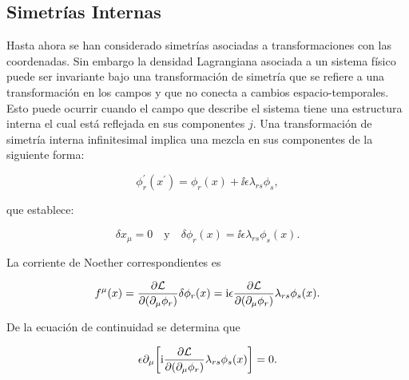 
\subsection{Simetrías Internas} \label{simint}

Hasta ahora se han considerado simetrías asociadas a transformaciones con las coordenadas. Sin embargo la densidad Lagrangiana asociada a un sistema físico puede ser invariante bajo una transformación de simetría que se refiere a una transformación en los campos y que no conecta a cambios espacio-temporales.\\

Esto puede ocurrir cuando el campo que describe el sistema tiene una estructura interna el cual está reflejada en sus componentes $j$. Una transformación de simetría interna infinitesimal implica una mezcla en sus componentes de la siguiente forma:

\begin{equation}
    \boxed{
    \phi_{r}^{\prime}(x^{\prime})= \phi_{r}(x)+\ii \epsilon \lambda_{rs}\phi_{s},}
    \label{eq_2.131}
\end{equation}

que establece:

\begin{equation}
    \delta x_{\mu} = 0 \quad \text{y} \quad \delta \phi_{r}(x) = \ii \epsilon \lambda_{rs}\phi_{s}(x).
\end{equation}

La corriente de Noether correspondientes es

\begin{equation}
    f^{\mu}(x) =\pdv{\mathcal{L}}{\qty(\partial_{\mu}\phi_{r})}\delta\phi_{r}(x) = \mathrm{i} \epsilon \pdv{\mathcal{L}}{\qty(\partial_{\mu}\phi_{r})}\lambda_{rs}\phi_{s}(x).
\end{equation}

De la ecuación de continuidad se determina que 

\begin{equation}
    \epsilon \partial_{\mu}\qty[\mathrm{i} \pdv{\mathcal{L}}{\qty(\partial_{\mu}\phi_{r})}\lambda_{rs}\phi_{s}(x)]=0.
\end{equation}

